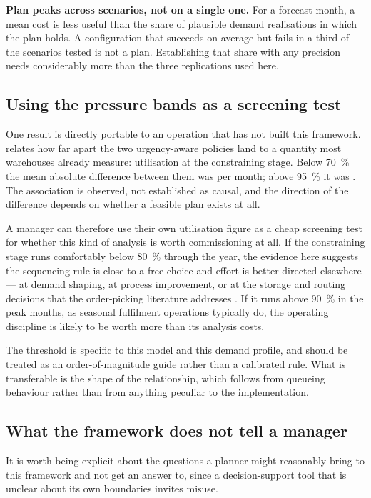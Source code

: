 \textbf{Plan peaks across scenarios, not on a single one.} For a forecast month, a mean cost is
less useful than the share of plausible demand realisations in which the plan holds. A
configuration that succeeds on average but fails in a third of the scenarios tested is not a
plan. Establishing that share with any precision needs considerably more than the three
replications used here.

\subsection{Using the pressure bands as a screening test}

One result is directly portable to an operation that has not built this framework.
 relates how far apart the two urgency-aware policies land to a
quantity most warehouses already measure: utilisation at the constraining stage. Below
\SI{70}{\percent} the mean absolute difference between them was  per month; above
\SI{95}{\percent} it was . The association is observed, not established as causal,
and the direction of the difference depends on whether a feasible plan exists at all.

A manager can therefore use their own utilisation figure as a cheap screening test for whether
this kind of analysis is worth commissioning at all. If the constraining stage runs comfortably
below \SI{80}{\percent} through the year, the evidence here suggests the sequencing rule is
close to a free choice and effort is better directed elsewhere --- at demand shaping, at
process improvement, or at the storage and routing decisions that the order-picking literature
addresses \citep{petersen2004}. If it runs above \SI{90}{\percent} in the peak months, as
seasonal fulfilment operations typically do, the operating discipline is likely to be worth more
than its analysis costs.

The threshold is specific to this model and this demand profile, and should be treated as an
order-of-magnitude guide rather than a calibrated rule. What is transferable is the shape of the
relationship, which follows from queueing behaviour rather than from anything peculiar to the
implementation.

\subsection{What the framework does not tell a manager}

It is worth being explicit about the questions a planner might reasonably bring to this
framework and not get an answer to, since a decision-support tool that is unclear about its own
boundaries invites misuse.

